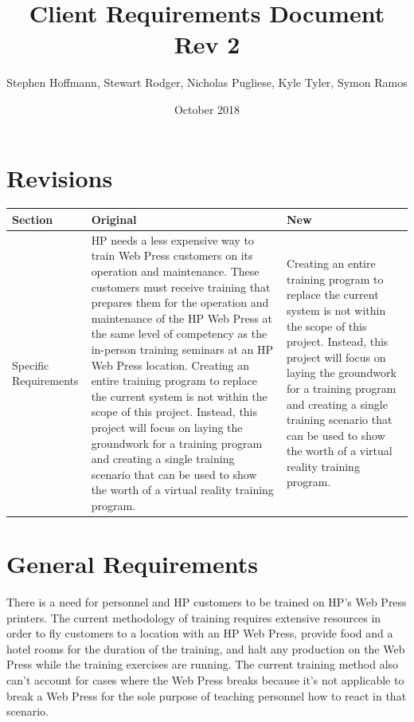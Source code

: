 \documentclass[onecolumn, draftclsnofoot,10pt, compsoc]{IEEEtran}
\title{Client Requirements Document Rev 2}
\author{Stephen Hoffmann, Stewart Rodger, Nicholas Pugliese, Kyle Tyler, Symon Ramos}
\date{October 2018}
\begin{document}
\setlength\parindent{0pt}
\maketitle

\section*{Revisions}

\begin{table}[ht!]
\begin{tabularx}{\textwidth}{|l|X|X|}
\hline
\rowcolor[HTML]{C0C0C0} 
Section & Original & New \\ \hline
Specific Requirements &  HP needs a less expensive way to train Web Press customers on its operation and maintenance. These customers must receive training that prepares them for the operation and maintenance of the HP Web Press at the same level of competency as the in-person training seminars at an HP Web Press location. Creating an entire training program to replace the current system is not within the scope of this project. Instead, this project will focus on laying the groundwork for a training program and creating a single training scenario that can be used to show the worth of a virtual reality training program.    & Creating an entire training program to replace the current system is not within the scope of this project. Instead, this project will focus on laying the groundwork for a training program and creating a single training scenario that can be used to show the worth of a virtual reality training program.   \\ \hline
\end{tabularx}
\end{table}

\section{General Requirements}
There is a need for personnel and HP customers to be trained on HP's Web Press printers. The current methodology of training requires extensive resources in order to fly customers to a location with an HP Web Press, provide food and a hotel rooms for the duration of the training, and halt any production on the Web Press while the training exercises are running. The current training method also can't account for cases where the Web Press breaks because it's not applicable to break a Web Press for the sole purpose of teaching personnel how to react in that scenario.
\end{document}

